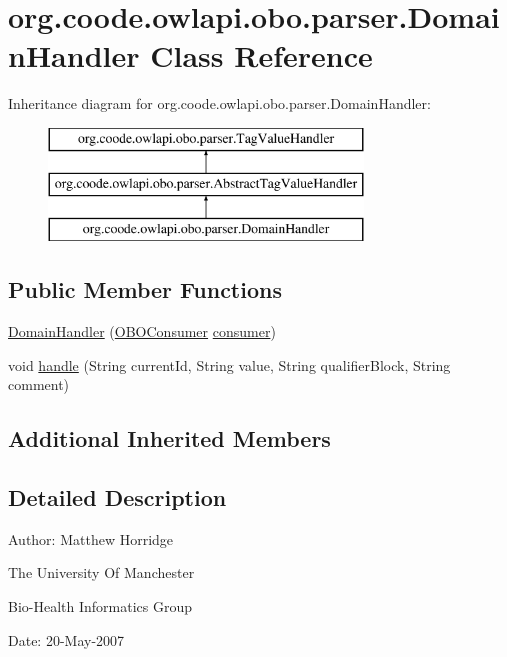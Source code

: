 \hypertarget{classorg_1_1coode_1_1owlapi_1_1obo_1_1parser_1_1_domain_handler}{\section{org.\-coode.\-owlapi.\-obo.\-parser.\-Domain\-Handler Class Reference}
\label{classorg_1_1coode_1_1owlapi_1_1obo_1_1parser_1_1_domain_handler}
}
Inheritance diagram for org.\-coode.\-owlapi.\-obo.\-parser.\-Domain\-Handler\-:\begin{figure}[H]
\begin{center}
\leavevmode
\includegraphics[height=3.000000cm]{classorg_1_1coode_1_1owlapi_1_1obo_1_1parser_1_1_domain_handler}
\end{center}
\end{figure}
\subsection*{Public Member Functions}
\begin{DoxyCompactItemize}
\item 
\hyperlink{classorg_1_1coode_1_1owlapi_1_1obo_1_1parser_1_1_domain_handler_ac26790ce12bee680fa090395fcc2c251}{Domain\-Handler} (\hyperlink{classorg_1_1coode_1_1owlapi_1_1obo_1_1parser_1_1_o_b_o_consumer}{O\-B\-O\-Consumer} \hyperlink{classorg_1_1coode_1_1owlapi_1_1obo_1_1parser_1_1_abstract_tag_value_handler_ab27f1ff22d15640c5f81585f18265137}{consumer})
\item 
void \hyperlink{classorg_1_1coode_1_1owlapi_1_1obo_1_1parser_1_1_domain_handler_aa485544c0f560f586c0652aed085e15e}{handle} (String current\-Id, String value, String qualifier\-Block, String comment)
\end{DoxyCompactItemize}
\subsection*{Additional Inherited Members}


\subsection{Detailed Description}
Author\-: Matthew Horridge\par
 The University Of Manchester\par
 Bio-\/\-Health Informatics Group\par
 Date\-: 20-\/\-May-\/2007\par
\par
 


